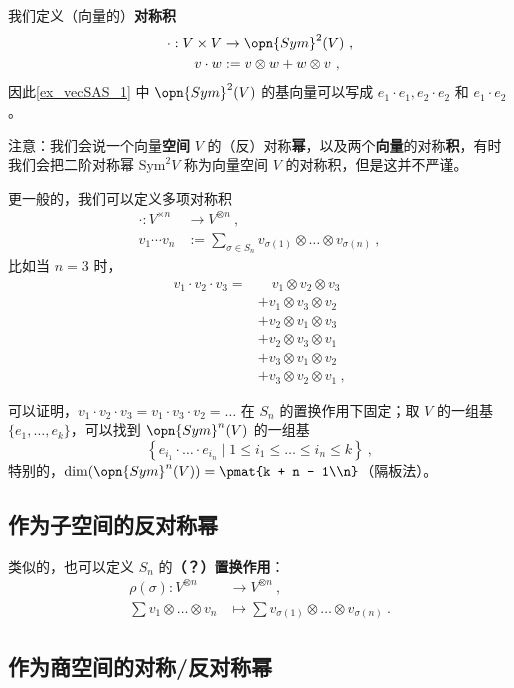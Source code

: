 我们定义（向量的）\textbf{对称积}
\begin{equation}
\begin{aligned}
\cdot: V \times V &\to \opn{Sym}^2(V)~, \\
v \cdot w &:= v \otimes w + w \otimes v~,
\end{aligned}
\end{equation}
因此\autoref{ex_vecSAS_1} 中 $\opn{Sym}^2(V)$ 的基向量可以写成 $e_1 \cdot e_1, e_2 \cdot e_2$ 和 $e_1 \cdot e_2$。

注意：我们会说一个向量\textbf{空间} $V$ 的（反）对称\textbf{幂}，以及两个\textbf{向量}的对称\textbf{积}，有时我们会把二阶对称幂 $\text{Sym}^2 V$ 称为向量空间 $V$ 的对称积，但是这并不严谨。

更一般的，我们可以定义多项对称积
\begin{equation}
\begin{aligned}
\cdot: V^{\times n} &\to V^{\otimes n}~, \\
v_1 \cdots v_n &:= \sum_{\sigma \in S_n} v_{\sigma(1)} \otimes \dots \otimes v_{\sigma(n)}~,
\end{aligned}
\end{equation}
比如当 $n = 3$ 时，
\begin{equation}
\begin{aligned}
v_1 \cdot v_2 \cdot v_3 = &\quad v_1 \otimes v_2 \otimes v_3 \\
&+ v_1 \otimes v_3 \otimes v_2 \\
&+ v_2 \otimes v_1 \otimes v_3 \\
&+ v_2 \otimes v_3 \otimes v_1 \\
&+ v_3 \otimes v_1 \otimes v_2 \\
&+ v_3 \otimes v_2 \otimes v_1~,
\end{aligned}
\end{equation}

可以证明，$v_1 \cdot v_2 \cdot v_3 = v_1 \cdot v_3 \cdot v_2 = \dots$ 在 $S_n$ 的置换作用下固定；取 $V$ 的一组基 $\{e_1, \dots, e_k\}$，可以找到 $\opn{Sym}^n(V)$ 的一组基
\begin{equation}
\left\{ e_{i_1} \cdot \dots \cdot e_{i_n} \mid 1 \leq i_1 \leq \dots \leq i_n \leq k \right\}~,
\end{equation}
特别的，$\dim(\opn{Sym}^n(V)) = \pmat{k + n - 1\\n}$（隔板法）。


\subsection{作为子空间的反对称幂}

类似的，也可以定义 $S_n$ 的\textbf{（？）置换作用}：
\begin{equation}
\begin{aligned}
\rho(\sigma): V^{\otimes n} &\to V^{\otimes n}~, \\
\sum v_1 \otimes \dots \otimes v_n &\mapsto \sum v_{\sigma(1)} \otimes \dots \otimes v_{\sigma(n)}~.
\end{aligned}
\end{equation}

\subsection{作为商空间的对称/反对称幂}